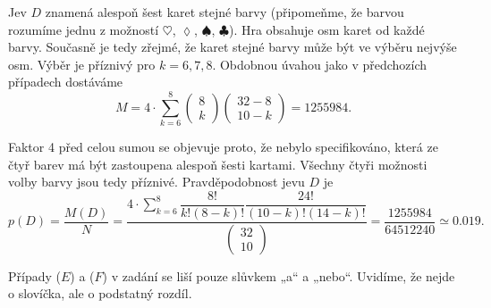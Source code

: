 \begin{example}
    Jev \(D\) znamená alespoň šest karet stejné barvy (připomeňme, že barvou rozumíme jednu z 
    možností \(\heartsuit\), \(\lozenge\), \(\spadesuit\), \(\clubsuit\)). Hra obsahuje osm karet 
    od každé barvy. Současně je tedy zřejmé, že karet stejné barvy může být ve výběru nejvýše osm. 
    Výběr je příznivý pro \(k = 6, 7, 8\). Obdobnou úvahou jako v předchozích případech dostáváme
    \begin{equation*}
      M = 4\cdot\sum^{8}_{k=6}
          \begin{pmatrix} 8 \\ k \end{pmatrix}\begin{pmatrix} 32 - 8 \\ 10 - k\end{pmatrix}
        = \num{1255984}.
    \end{equation*}
    
    Faktor \num{4} před celou sumou se objevuje proto, že nebylo specifikováno, která ze čtyř barev 
    má být zastoupena alespoň šesti kartami. Všechny čtyři možnosti volby barvy jsou tedy příznivé. 
    Pravděpodobnost jevu \(D\) je
    \begin{equation*}
      p(D)  = \dfrac{M(D)}{N}
            = \dfrac{4\cdot\sum^{8}_{k=6}\dfrac{8!}{k!(8-k)!}\dfrac{24!}{(10-k)!(14-k)!}}
                    {\begin{pmatrix} 32 \\ 10 \end{pmatrix}}                               
            = \dfrac{\num{1255984}}{\num{64512240}} \simeq \num{0.019}.
    \end{equation*}
    
    Případy (\(E\)) a (\(F\)) v zadání se liší pouze slůvkem „a“ a „nebo“. Uvidíme, že nejde o 
    slovíčka, ale o podstatný rozdíl. 
    

\end{example}
